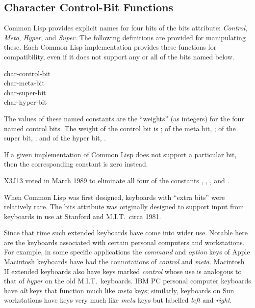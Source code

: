 \begin{obsolete}

\section{Character Control-Bit Functions}

Common Lisp provides explicit names for four bits of the bits attribute:
{\it Control}, {\it Meta}, {\it Hyper}, and {\it Super}.  The following
definitions are provided for manipulating these.
Each Common Lisp implementation provides these functions for compatibility,
even if it does not support any or all of the bits named below.
\end{obsolete}


\begin{obsolete}
\begin{defun}[Constant]
char-control-bit \\
char-meta-bit \\
char-super-bit \\
char-hyper-bit

The values of these named constants are the ``weights'' (as integers) for
the four named control bits.  The weight of the control bit is ;
of the meta bit, ; of the super bit, ; and of the hyper bit, .

If a given implementation of Common Lisp does not support a particular bit,
then the corresponding constant is zero instead.
\end{defun}
\end{obsolete}

\begin{newer}
X3J13 voted in March 1989 
to eliminate all four of the constants
, , ,
and .
\end{newer}
\medskip
\begin{new}
When Common Lisp was first designed, keyboards with ``extra bits'' were
relatively rare.  The bits attribute was originally designed to support input
from keyboards in use at Stanford and M.I.T.~circa 1981.

Since that time such extended keyboards have come into wider use.
Notable here are the keyboards associated with certain
personal computers and workstations.  For example, in some specific applications
the {\it command} and {\it option} keys of Apple Macintosh keyboards have
had the connotations of {\it control} and {\it meta}.  Macintosh II
extended keyboards also have keys marked {\it control} whose use
is analogous to that of {\it hyper} on the old M.I.T.~keyboards.
IBM PC personal computer keyboards have {\it alt} keys that function
much like {\it meta} keys; similarly, keyboards on Sun workstations
have keys very much like {\it meta} keys but labelled {\it left} and {\it right}.
\end{new}

